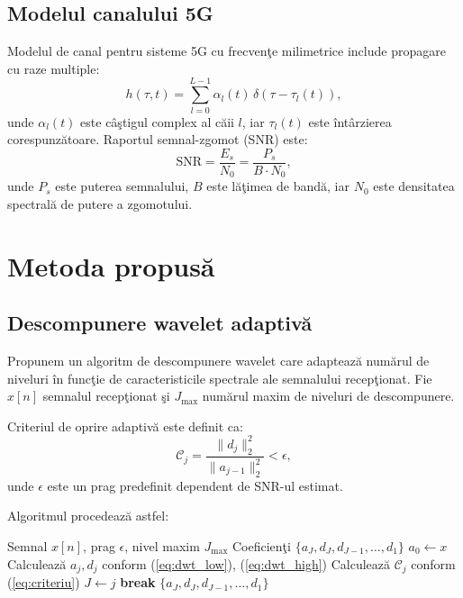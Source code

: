 \documentclass[12pt,a4paper]{article}
\begin{document}
\subsection{Modelul canalului 5G}

Modelul de canal pentru sisteme 5G cu frecvenţe milimetrice include
propagare cu raze multiple:
\begin{equation}
\label{eq:canal}
h(\tau, t) = \sum_{l=0}^{L-1} \alpha_l(t) \, \delta(\tau - \tau_l(t)),
\end{equation}
unde $\alpha_l(t)$ este câştigul complex al căii $l$, iar $\tau_l(t)$
este întârzierea corespunzătoare. Raportul semnal-zgomot (SNR) este:
\[
\mathrm{SNR} = \frac{E_s}{N_0} = \frac{P_s}{B \cdot N_0},
\]
unde $P_s$ este puterea semnalului, $B$ este lăţimea de bandă, iar
$N_0$ este densitatea spectrală de putere a zgomotului.

\section{Metoda propusă}
\label{sec:metoda}

\subsection{Descompunere wavelet adaptivă}

Propunem un algoritm de descompunere wavelet care adaptează numărul
de niveluri în funcţie de caracteristicile spectrale ale semnalului
recepţionat. Fie $x[n]$ semnalul recepţionat şi $J_{\max}$ numărul
maxim de niveluri de descompunere.

\begin{definition}
Criteriul de oprire adaptivă este definit ca:
\begin{equation}
\label{eq:criteriu}
\mathcal{C}_j = \frac{\|d_j\|_2^2}{\|a_{j-1}\|_2^2} < \epsilon,
\end{equation}
unde $\epsilon$ este un prag predefinit dependent de SNR-ul estimat.
\end{definition}

Algoritmul procedează astfel:

\begin{algorithm}[ht]
\caption{Descompunere wavelet adaptivă}
\label{alg:dwt_adaptiv}
\begin{algorithmic}[1]
\Require Semnal $x[n]$, prag $\epsilon$, nivel maxim $J_{\max}$
\Ensure Coeficienţi $\{a_J, d_J, d_{J-1}, \ldots, d_1\}$
\State $a_0 \gets x$
  \State Calculează $a_j, d_j$ conform (\ref{eq:dwt_low}), (\ref{eq:dwt_high})
  \State Calculează $\mathcal{C}_j$ conform (\ref{eq:criteriu})
    \State $J \gets j$
    \State \textbf{break}
  \EndIf
\EndFor
\State \Return $\{a_J, d_J, d_{J-1}, \ldots, d_1\}$
\end{algorithmic}
\end{algorithm}
\end{document}
